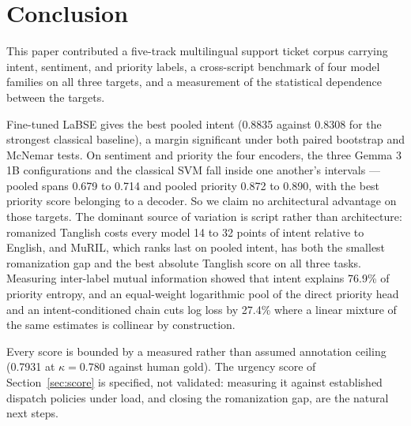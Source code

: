 \section{Conclusion}
\label{sec:conclusion}

This paper contributed a five-track multilingual support ticket corpus carrying
intent, sentiment, and priority labels, a cross-script benchmark of four model
families on all three targets, and a measurement of the statistical dependence
between the targets.

Fine-tuned LaBSE gives the best pooled intent \macrof{} (0.8835 against 0.8308
for the strongest classical baseline), a margin significant under both paired
bootstrap and McNemar tests. On sentiment and priority the four encoders, the
three Gemma 3 1B configurations and the classical SVM fall inside one another's
intervals --- pooled \negf{} spans 0.679 to 0.714 and pooled priority 0.872 to
0.890, with the best priority score belonging to a decoder. So we claim no
architectural advantage on those targets. The dominant source of variation is
script rather than architecture: romanized Tanglish costs every model 14 to 32
points of intent \macrof{} relative to English, and MuRIL, which ranks last on
pooled intent, has both the smallest romanization gap and the best absolute
Tanglish score on all three tasks. Measuring inter-label mutual information
showed that intent explains 76.9\% of priority entropy, and an equal-weight
logarithmic pool of the direct priority head and an intent-conditioned chain
cuts log loss by 27.4\% where a linear mixture of the same estimates is
collinear by construction.

Every score is bounded by a measured rather than assumed annotation ceiling
(0.7931 \negf{} at $\kappa = 0.780$ against human gold). The urgency score of
Section~\ref{sec:score} is specified, not validated: measuring it against
established dispatch policies under load, and closing the romanization gap, are
the natural next steps.
